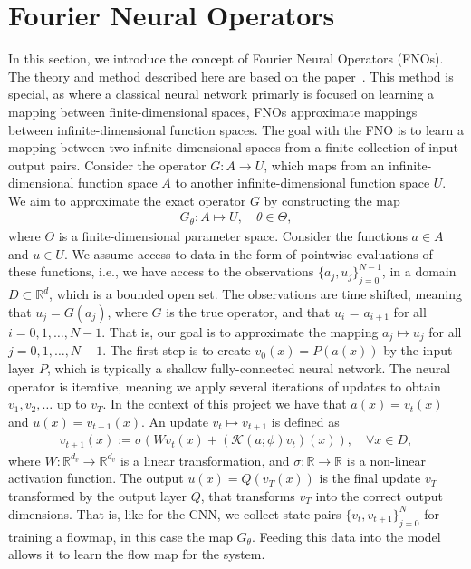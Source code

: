 \section{Fourier Neural Operators}
In this section, we introduce the concept of Fourier Neural Operators (FNOs).
The theory and method described here are based on the paper~\cite{FNO_2021}.
This method is special, as where a classical neural network primarly is focused on learning a mapping between finite-dimensional spaces, FNOs approximate mappings between infinite-dimensional function spaces.
The goal with the FNO is to learn a mapping between two infinite dimensional spaces from a finite collection of input-output pairs.
Consider the operator $G: A \to U$, which maps from an infinite-dimensional function space $A$ to another infinite-dimensional function space $U$.
We aim to approximate the exact operator $G$ by constructing the map
\begin{align}\label{eq:FNO_map}
    G_{\theta}: A \mapsto U, \quad \theta \in \Theta,
\end{align} 
where $\Theta$ is a finite-dimensional parameter space.
Consider the functions $a \in A$ and $u \in U$.
We assume access to data in the form of pointwise evaluations of these functions, i.e., we have access to the observations ${\{a_j, u_j \}}_{j=0}^{N-1}$, in a domain $D \subset \mathbb{R}^d$, which is a bounded open set.
The observations are time shifted, meaning that $u_j = G(a_j)$, where $G$ is the true operator, and that $u_i$ = $a_{i+1}$ for all $i = 0, 1, \ldots, N-1$. 
That is, our goal is to approximate the mapping $a_j \mapsto u_j$ for all $j = 0, 1, \ldots, N-1$.
The first step is to create $v_0(x) = P(a(x))$ by the input layer $P$, which is typically a shallow fully-connected neural network.
The neural operator is iterative, meaning we apply several iterations of updates to obtain $v_1, v_2, \ldots$ up to $v_T$.
In the context of this project we have that $a(x) = v_t(x)$ and $u(x) = v_{t+1}(x)$.
An update $v_t \mapsto v_{t+1}$ is defined as
\begin{align}
    v_{t+1}(x) := \sigma \left( W v_t(x) + \left( \mathcal{K}(a;\phi)v_t \right) (x) \right), \quad \forall x \in D,
\end{align}
where $W: \mathbb{R}^{d_v} \to \mathbb{R}^{d_v}$ is a linear transformation, and $\sigma: \mathbb{R} \to \mathbb{R}$ is a non-linear activation function.
The output $u(x) = Q(v_T(x))$ is the final update $v_T$ transformed by the output layer $Q$, that transforms $v_T$ into the correct output dimensions.
That is, like for the CNN, we collect state pairs ${\{v_t, v_{t+1}\}}_{j=0}^N$ for training a flowmap, in this case the map $G_{\theta}$.
Feeding this data into the model allows it to learn the flow map for the system.

